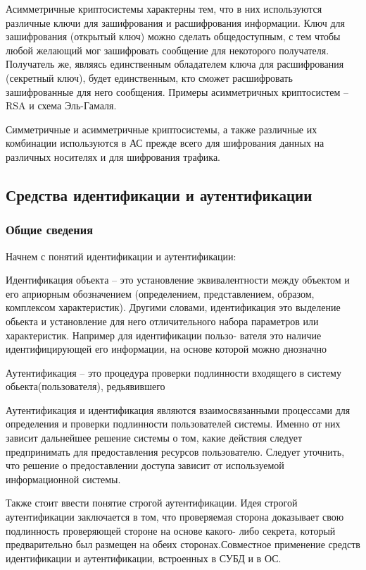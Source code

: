 Асимметричные криптосистемы характерны тем, что в них используются различные ключи для зашифрования и расшифрования информации. Ключ для зашифрования (открытый ключ) можно сделать общедоступным, с тем чтобы любой желающий мог зашифровать сообщение для некоторого получателя. Получатель же, являясь единственным обладателем ключа для расшифрования (секретный ключ), будет единственным, кто сможет расшифровать зашифрованные для него сообщения. Примеры асимметричных криптосистем – RSA и схема Эль-Гамаля.

Симметричные и асимметричные криптосистемы, а также различные их комбинации используются в АС прежде всего для шифрования данных на различных носителях и для шифрования трафика.
\subsection{Средства идентификации и аутентификации}

\subsubsection{Общие сведения}
Начнем с понятий идентификации и аутентификации:

Идентификация объекта – это установление эквивалентности между объектом и его априорным обозначением (определением, представлением, образом, комплексом характеристик). Другими словами, идентификация это выделение обьекта и установление для него отличительного набора параметров или характеристик. Например для идентификации пользо- вателя это наличие идентифицирующей его информации, на основе которой можно днозначно %

Аутентификация – это процедура проверки подлинности входящего в систему обьекта(пользователя), редьявившего %

Аутентификация и идентификация являются взаимосвязанными процессами для определения и проверки подлинности пользователей системы. Именно от них зависит дальнейшее решение системы о том, какие действия следует предпринимать для предоставления ресурсов пользователю. Следует уточнить, что решение о предоставлении доступа зависит от используемой информационной системы.

Также стоит ввести понятие строгой аутентификации. Идея строгой аутентификации заключается в том, что проверяемая сторона доказывает свою подлинность проверяющей стороне на основе какого- либо секрета, который предварительно был размещен на обеих сторонах.Совместное применение средств идентификации и аутентификации,
встроенных в СУБД и в ОС.

